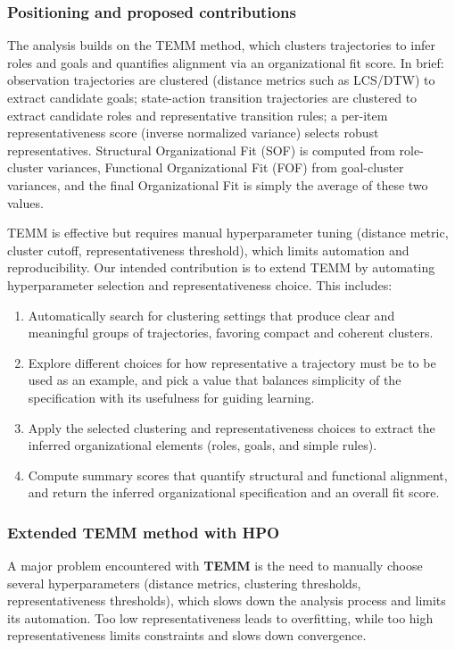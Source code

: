 \documentclass[pdflatex,sn-mathphys-num]{sn-jnl}%
\theoremstyle{thmstyleone}%
\theoremstyle{thmstyletwo}%
\theoremstyle{thmstylethree}%
\begin{document}
\subsubsection*{Positioning and proposed contributions}

The analysis builds on the TEMM method, which clusters trajectories to infer roles and goals and quantifies alignment via an organizational fit score. In brief: observation trajectories are clustered (distance metrics such as LCS/DTW) to extract candidate goals; state-action transition trajectories are clustered to extract candidate roles and representative transition rules; a per-item representativeness score (inverse normalized variance) selects robust representatives. Structural Organizational Fit (SOF) is computed from role-cluster variances, Functional Organizational Fit (FOF) from goal-cluster variances, and the final Organizational Fit is simply the average of these two values.

TEMM is effective but requires manual hyperparameter tuning (distance metric, cluster cutoff, representativeness threshold), which limits automation and reproducibility. Our intended contribution is to extend TEMM by automating hyperparameter selection and representativeness choice. This includes:
\begin{enumerate}
    \item Automatically search for clustering settings that produce clear and meaningful groups of trajectories, favoring compact and coherent clusters.
    \item Explore different choices for how representative a trajectory must be to be used as an example, and pick a value that balances simplicity of the specification with its usefulness for guiding learning.
    \item Apply the selected clustering and representativeness choices to extract the inferred organizational elements (roles, goals, and simple rules).
    \item Compute summary scores that quantify structural and functional alignment, and return the inferred organizational specification and an overall fit score.
\end{enumerate}



\subsubsection*{Extended TEMM method with HPO}

A major problem encountered with \textbf{TEMM} is the need to manually choose several hyperparameters (distance metrics, clustering thresholds, representativeness thresholds), which slows down the analysis process and limits its automation. Too low representativeness leads to overfitting, while too high representativeness limits constraints and slows down convergence.
\end{document}
